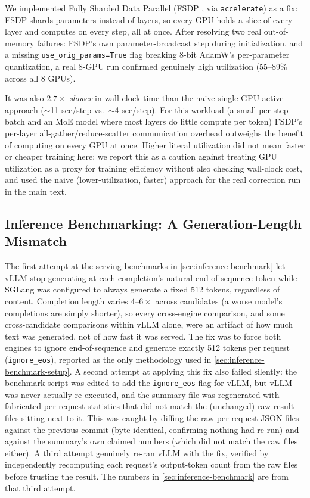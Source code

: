 \documentclass{article}
\theoremstyle{plain}
\theoremstyle{definition}
\theoremstyle{remark}
\begin{document}
We implemented Fully Sharded Data Parallel (FSDP \cite{fsdp2023}, via
\texttt{accelerate}) as a fix: FSDP shards parameters instead of layers,
so every GPU holds a slice of every layer and computes on every step,
all at once. After resolving two real out-of-memory failures: FSDP's
own parameter-broadcast step during initialization, and a missing
\texttt{use\_orig\_params=True} flag breaking 8-bit AdamW's
per-parameter quantization, a real 8-GPU run confirmed genuinely high
utilization (55--89\% across all 8 GPUs).

It was also $2.7\times$ \emph{slower} in wall-clock time than the naive
single-GPU-active approach ($\sim$11 sec/step vs.\ $\sim$4 sec/step).
For this workload (a small per-step batch and an MoE model where most
layers do little compute per token) FSDP's per-layer
all-gather/reduce-scatter communication overhead outweighs the benefit
of computing on every GPU at once. Higher literal utilization did not
mean faster or cheaper training here; we report this as a caution against
treating GPU utilization as a proxy for training efficiency without
also checking wall-clock cost, and used the naive (lower-utilization,
faster) approach for the real correction run in the main text.

\subsection{Inference Benchmarking: A Generation-Length Mismatch}
\label{app:inference-benchmark-bug}

The first attempt at the serving benchmarks in \cref{sec:inference-benchmark}
let vLLM stop generating at each completion's natural end-of-sequence
token while SGLang was configured to always generate a fixed 512
tokens, regardless of content. Completion length varies $4$--$6\times$
across candidates (a worse model's completions are simply shorter), so
every cross-engine comparison, and some cross-candidate comparisons
within vLLM alone, were an artifact of how much text was generated, not
of how fast it was served. The fix was to force both engines to ignore
end-of-sequence and generate exactly 512 tokens per request
(\texttt{ignore\_eos}), reported as the only methodology used in
\cref{sec:inference-benchmark-setup}. A second attempt at applying this
fix also failed silently: the benchmark script was edited to add the
\texttt{ignore\_eos} flag for vLLM, but vLLM was never actually
re-executed, and the summary file was regenerated with fabricated
per-request statistics that did not match the (unchanged) raw result
files sitting next to it. This was caught by diffing the raw per-request
JSON files against the previous commit (byte-identical, confirming
nothing had re-run) and against the summary's own claimed numbers
(which did not match the raw files either). A third attempt genuinely
re-ran vLLM with the fix, verified by independently recomputing each
request's output-token count from the raw files before trusting the
result. The numbers in \cref{sec:inference-benchmark} are from that
third attempt.
\end{document}
